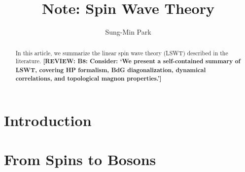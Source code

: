 \documentclass[aps, prx, nofootinbib, superscriptaddress]{revtex4-2}
\newcommand{\REVIEW}[1]{{\color{reviewcolor}\bfseries [REVIEW: #1]}}
\begin{document}
\title{Note: Spin Wave Theory}
\author{Sung-Min Park}
\affiliation{}
\begin{abstract}
    In this article, we summarize the linear spin wave theory (LSWT) described in the literature.
    \REVIEW{B8: Consider: `We present a self-contained summary of LSWT, covering HP formalism, BdG diagonalization, dynamical correlations, and topological magnon properties.'}
\end{abstract}
\maketitle

\tableofcontents

\newpage


\section{Introduction}\label{sec:introduction}


\section{From Spins to Bosons}
\end{document}

